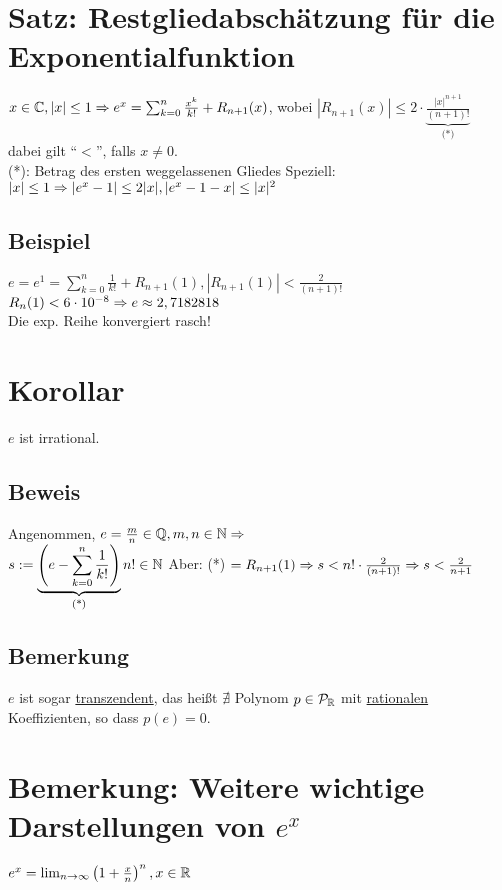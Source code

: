 \section{Satz: Restgliedabschätzung für die Exponentialfunktion}\label{8.12}
$x \in \mathbb{C}, |x| \le 1 \Rightarrow e^x = \sum_{k=0}^n \frac{x^k}{k!} + R_{n+1}(x)$, wobei $|R_{n+1}(x)| \le 2 \cdot \underbrace{\frac{|x|^{n+1}}{(n+1)!}}_{\text{(*)}}$\\
dabei gilt ``$<$'', falls $x \neq 0$.\\
(*): Betrag des ersten weggelassenen Gliedes\nl
Speziell: $|x| \le 1 \Rightarrow |e^x-1| \le 2|x|, |e^x-1-x| \le |x|^2$

\subsection*{Beispiel}
$e = e^1 = \sum_{k=0}^n \frac{1}{k!} + R_{n+1}(1), |R_{n+1}(1)| < \frac{2}{(n+1)!}$\\
$R_n(1) < 6 \cdot 10^{-8} \Rightarrow e \approx 2,7182818$\\
Die exp. Reihe konvergiert rasch!

\section{Korollar}\label{8.13}
$e$ ist irrational.

\subsection*{Beweis}
Angenommen, $e=\frac{m}{n} \in \mathbb{Q}, m,n \in \mathbb{N} \Rightarrow$\\
$s := \underbrace{\left(e - \sum_{k=0}^n \frac{1}{k!}\right)}_{\text{(*)}} n! \in \mathbb{N}$\nl
Aber: (*) $= R_{n+1}(1) \Rightarrow s < n! \cdot \frac{2}{(n+1)!} \Rightarrow s < \frac{2}{n+1}$ \wspruch

\subsection*{Bemerkung}
$e$ ist sogar \underline{transzendent}, das heißt $\nexists$ Polynom $p \in \mathcal{P}_{\mathbb{R}}$ mit \underline{rationalen} Koeffizienten, so dass $p(e)=0$.


\section{\texorpdfstring{Bemerkung: Weitere wichtige Darstellungen von $e^x$}{Bemerkung: Weitere wichtige Darstellungen von e hoch x}}\label{8.14}
$e^x = \lim_{n \to \infty} \left(1+\frac{x}{n}\right)^n, x \in \mathbb{R}$

